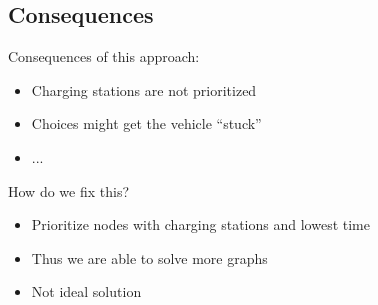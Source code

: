 \subsection{Consequences}
\begin{frame}{Consequences of this approach:}
  \begin{itemize}
    \item Charging stations are not prioritized
    \item Choices might get the vehicle ``stuck''
    \item ...
  \end{itemize}
\end{frame}
\begin{frame}
  How do we fix this?
  \begin{itemize}
    \item Prioritize nodes with charging stations and lowest time
    \item Thus we are able to solve more graphs
    \item Not ideal solution
  \end{itemize}

\end{frame}
